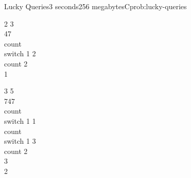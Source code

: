 \begin{programmingproblem}{Lucky Queries}{3 seconds}{256 megabytes}{C}{prob:lucky-queries}
    \begin{problemexamples}
        \begin{example}{
            2 3\\
            47\\
            count\\
            switch 1 2\\
            count
        }{
            2\\
            1
        }
        \end{example}
        \begin{example}{
            3 5\\
            747\\
            count\\
            switch 1 1\\
            count\\
            switch 1 3\\
            count
        }{
            2\\
            3\\
            2
        }
        \end{example}
    \end{problemexamples}
    
\end{programmingproblem}
